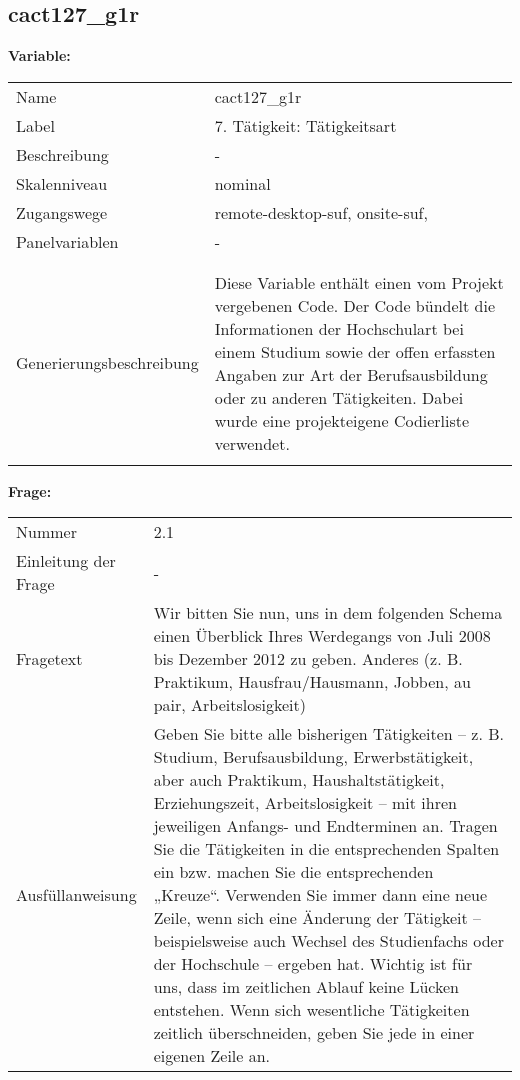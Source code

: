 	
	
	\subsection{cact127\_g1r}
	\label{subSection:cact127_g1r}

	\noindent\textbf{Variable:}\\
		\begin{tabular}{lL{11.3cm}}
			\label{tableVariable:cact127_g1r}
			Name & cact127\_g1r \\
			Label & 7. Tätigkeit: Tätigkeitsart \\
			Beschreibung & - \\
			Skalenniveau & nominal \\
			Zugangswege &
				remote-desktop-suf,
				onsite-suf,
 \\
			Panelvariablen & -
			 \\
			 \\
 \\
					Generierungsbeschreibung & Diese Variable enthält einen vom Projekt vergebenen Code. Der Code bündelt die  Informationen der Hochschulart bei einem Studium sowie der  offen erfassten Angaben zur Art der Berufsausbildung oder zu anderen Tätigkeiten. Dabei wurde eine projekteigene Codierliste verwendet.
				 \\	
			 \\
		\end{tabular}

		\vspace*{1 cm}
		\noindent\textbf{Frage:}\\
		\begin{tabular}{lL{11.3cm}}
			\label{tableQuestion:cact127_g1r}
			Nummer & 2.1 \\
			Einleitung der Frage & - \\
			Fragetext & Wir bitten Sie nun, uns in dem folgenden Schema einen Überblick Ihres Werdegangs von Juli 2008 bis Dezember 2012 zu geben.
Anderes
(z. B. Praktikum, Hausfrau/Hausmann, Jobben, au pair, Arbeitslosigkeit) \\
			Ausfüllanweisung & Geben Sie bitte alle bisherigen Tätigkeiten – z. B. Studium, Berufsausbildung, Erwerbstätigkeit, aber auch Praktikum, Haushaltstätigkeit,
Erziehungszeit, Arbeitslosigkeit – mit ihren jeweiligen Anfangs- und Endterminen an. Tragen Sie die Tätigkeiten in die entsprechenden Spalten ein bzw. machen Sie die entsprechenden „Kreuze“. Verwenden Sie immer dann eine neue Zeile, wenn sich eine Änderung der Tätigkeit – beispielsweise auch Wechsel des Studienfachs oder der Hochschule – ergeben hat. Wichtig ist für uns, dass im zeitlichen Ablauf keine Lücken entstehen. Wenn sich wesentliche Tätigkeiten zeitlich überschneiden, geben Sie jede in einer eigenen Zeile an. \\
		\end{tabular}





